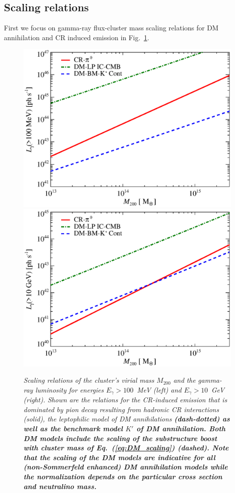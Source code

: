 \documentclass[10pt,aps,pra,reprint,amsmath,amsfonts,amssymb,showpacs,nofootinbib,floatfix]{revtex4-1}
\def\C#1{{\bf #1}}
\newcommand{\mvir}{M_{200}}
\begin{document}
\subsection{Scaling relations}
First we focus on gamma-ray flux-cluster mass scaling relations for DM
annihilation and CR induced emission in
Fig.~\ref{fig:lum_mass_scaling}.  
\begin{figure}
  \includegraphics[width=0.99\columnwidth]{figures/MLscaling.100M.eps}
  \includegraphics[width=0.99\columnwidth]{figures/MLscaling.10G.eps}
  \caption{\it Scaling relations of the cluster's virial mass $\mvir$
    and the gamma-ray luminosity for energies $E_\gamma>100$~MeV
    (left) and $E_\gamma>10$~GeV (right).  Shown are the relations for
    the CR-induced emission that is dominated by pion decay resulting
    from hadronic CR interactions (solid), the leptophilic model of DM
    annihilations \C{(dash-dotted) as well as the benchmark model $K'$
      of DM annihilation. Both DM models include the scaling of the
      substructure boost with cluster mass of
      Eq.~(\ref{eq:DM_scaling}) (dashed). Note that the scaling of the
      DM models are indicative for all (non-Sommerfeld enhanced)
      DM annihilation models while the normalization depends on the
      particular cross section and neutralino mass.}}
\label{fig:lum_mass_scaling}
\end{figure}
\end{document}
